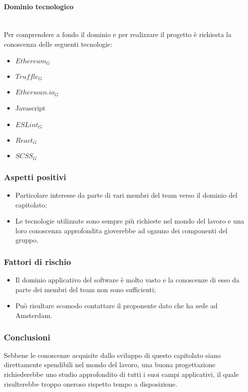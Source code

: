 			\paragraph{Dominio tecnologico}
			\mbox{}\\
			Per comprendere a fondo il dominio e per realizzare il progetto è richiesta la conoscenza delle seguenti tecnologie:
			\begin{itemize}
				\item $Ethereum_G$
				\item $Truffle_G$
				\item $Etherscan.io_G$
				\item Javascript
				\item $ESLint_G$
				\item $React_G$
				\item $SCSS_G$
			\end{itemize}
		\subsubsection{Aspetti positivi}
		\begin{itemize}
			\item Particolare interesse da parte di vari membri del team verso il dominio del capitolato;
			\item Le tecnologie utilizzate sono sempre più richieste nel mondo del lavoro e una loro conoscenza approfondita gioverebbe ad ognuno dei componenti del gruppo.
		\end{itemize}
		\subsubsection{Fattori di rischio}
		\begin{itemize}
			\item Il dominio applicativo del software è molto vasto e la conoscenze di esso da parte dei membri del team non sono sufficienti;
			\item Può risultare scomodo contattare il proponente dato che ha sede ad Amsterdam.
		\end{itemize}
		\subsubsection{Conclusioni}
		Sebbene le conoscenze acquisite dallo sviluppo di questo capitolato siano direttamente spendibili nel mondo del lavoro, una buona progettazione richiederebbe uno studio approfondito di tutti i suoi campi applicativi, il quale risulterebbe troppo oneroso rispetto tempo a disposizione.
	
